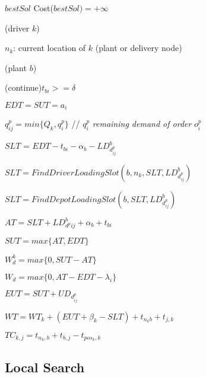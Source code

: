 \documentclass{article}
\begin{document}
{{{\begin{algorithm}[htb]
{            $bestSol$ Cost($bestSol)= +\infty$
            
            \ForEach(driver $k$){}
            {
                $n_k$: current location of $k$ (plant or delivery node)
                
                \ForEach(plant $b$){}
                {
                    
                    \uIf(continue){$t_{bi} >= \delta $}{      }
                    
                    $EDT=SUT=a_i$


            $q^p_{ij}=min\{Q_k,q^p_i \}$ // $q^p_i$ \textit{remaining demand of order} $o^p_i$

            $SLT$ = $EDT - t_{bi} - \alpha_b - LD^b_{d^p_{ij}} $
        
            $SLT = FindDriverLoadingSlot(b, n_k, SLT, LD^b_{d^p_{ij}})$
                    
            $SLT = FindDepotLoadingSlot(b, SLT, LD^b_{d^p_{ij}})$

            $AT =  SLT + LD^b_{d^p{ij}} + \alpha_b + t_{bi}$

            $SUT = max\{AT, EDT\}$

            $W^k_{d}= max\{0,SUT - AT\}$

            $W_{d}= max\{0,AT - EDT - \lambda_i\}$

            $EUT = SUT + UD_{d^p_{ij}} $

            $WT = WT_k + (EUT + \beta_k - SLT) + t_{n_kb} + t_{j,k}$

            $TC_{k,j} = t_{n_k,b} + t_{b,j}  - t_{pos_k,k}$

            }
            }
            }
        \end{algorithm}
    }
}


\subsection*{ Local Search}




}
\end{document}
